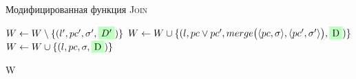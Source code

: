 \begin{algorithm}[H]
    \caption{Модифицированная функция \textsc{Join}} \label{new_join}
\begin{algorithmic}[1]
         \label{alg:merge_start}
            \State $W \gets W \setminus \{(l',pc',\sigma',\mkGreen{$D'$})\}$
            \State $W \gets W \cup \{(l,pc \lor pc',\Merge{\pair{pc}{\sigma},\pair{pc'}{\sigma'}},\mkGreen{D})\}$
        \Else
            \State $W \gets W \cup \{(l, pc, \sigma, \mkGreen{D})\}$ \label{alg:merge_end}
        \EndIf

        \State \Return W
    \EndProcedure
\end{algorithmic}
\end{algorithm}


